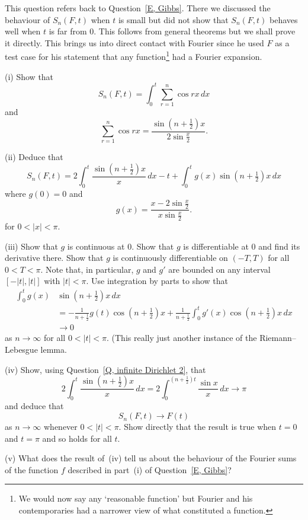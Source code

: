 \begin{question}\label{E, Fourier}
This question refers back to Question~\ref{E, Gibbs}.
There we discussed the behaviour of $S_{n}(F,t)$ when $t$ is small
but did not show that $S_{n}(F,t)$ behaves well when $t$ is far from $0$.
This follows from general theorems but we shall prove it directly.
This brings us into direct contact with Fourier since he used
$F$ as a test case for his statement that any
function\footnote{We would now say any `reasonable function'
but Fourier and his contemporaries had a narrower view
of what constituted a function.} had a Fourier expansion.

(i) Show that
\[S_{n}(F,t)=\int_{0}^{t}\sum_{r=1}^{n}\cos rx\,dx\]
and
\[\sum_{r=1}^{n}\cos rx=\frac{\sin(n+\tfrac{1}{2})x}{2\sin\tfrac{x}{2}}.\]

(ii) Deduce that
\[S_{n}(F,t)=2\int_{0}^{t}\frac{\sin(n+\tfrac{1}{2})x}{x}\,dx
-t+\int_{0}^{t}g(x)\sin(n+\tfrac{1}{2})x\,dx\]
where $g(0)=0$
and
\[g(x)=\frac{x-2\sin\tfrac{x}{2}}{x\sin\tfrac{x}{2}}.\]
for $0<|x|<\pi$.

(iii) Show that $g$ is continuous at $0$. Show that $g$ is
differentiable at $0$ and find its derivative there. Show
that $g$ is continuously differentiable on $(-T,T)$ for
all $0<T<\pi$. Note that, in particular, $g$ and $g'$
are bounded on any interval $[-|t|,|t|]$ with
$|t|<\pi$. Use integration by parts to show that
\begin{align*}
\int_{0}^{t}g(x)&\sin(n+\tfrac{1}{2})x\,dx\\
&=-\frac{1}{n+\tfrac{1}{2}}g(t)\cos(n+\tfrac{1}{2})x
+\frac{1}{n+\tfrac{1}{2}}
\int_{0}^{t}g'(x)\cos(n+\tfrac{1}{2})x\,dx\\
&\rightarrow 0
\end{align*}
as $n\rightarrow \infty$ for all $0<|t|<\pi$.
(This really just another instance of the Riemann--Lebesgue
lemma.


(iv) Show, using Question~\ref{Q, infinite Dirichlet 2},
that
\[2\int_{0}^{t}\frac{\sin(n+\tfrac{1}{2})x}{x}\,dx
=2\int_{0}^{(n+\tfrac{1}{2})t}\frac{\sin x}{x}\,dx
\rightarrow \pi\]
and deduce that
\[S_{n}(F,t)\rightarrow F(t)\]
as $n\rightarrow\infty$ whenever $0<|t|<\pi$. Show directly
that the result is true when $t=0$ and $t=\pi$
and so holds for all $t$.

(v) What does the result of~(iv) tell us about the behaviour
of the Fourier sums of the function $f$ described in
part~(i) of Question~\ref{E, Gibbs}?
\end{question}
